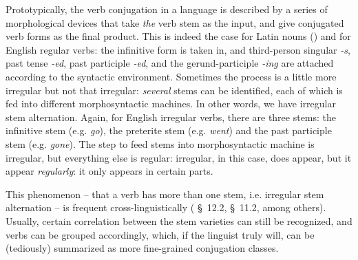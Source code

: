 \documentclass{article}
\newcommand*{\citesec}[1]{\S~{#1}}
\newcommand*{\corpus}[1]{\emph{#1}}
\begin{document}
Prototypically, the verb conjugation in a language is described by 
a series of morphological devices that take \emph{the} verb stem as the input,
and give conjugated verb forms as the final product.
This is indeed the case for Latin nouns ()
and for English regular verbs:
the infinitive form is taken in,
and third-person singular \corpus{-s}, past tense \corpus{-ed}, 
past participle \corpus{-ed}, and the gerund-participle \corpus{-ing}
are attached according to the syntactic environment.
Sometimes the process is a little more irregular but not that irregular:
\emph{several} stems can be identified, each of which is fed into different morphosyntactic machines.
In other words, we have irregular stem alternation.
Again, for English irregular verbs,
there are three stems: the infinitive stem (e.g. \corpus{go}), 
the preterite stem (e.g. \corpus{went})
and the past participle stem (e.g. \corpus{gone}).
The step to feed stems into morphosyntactic machine is irregular,
but everything else is regular:
irregular, in this case, does appear, but it appear \emph{regularly}:
it only appears in certain parts.

This phenomenon -- that a verb has more than one stem, i.e. irregular stem alternation
-- is frequent cross-linguistically
(\citealt{jacques2021grammar} \citesec{12.2}, \citealt{forker2020grammar} \citesec{11.2}, among others).
Usually, certain correlation between the stem varieties can still be recognized,
and verbs can be grouped accordingly,
which, if the linguist truly will, can be (tediously) summarized as more fine-grained conjugation classes.
\end{document}
